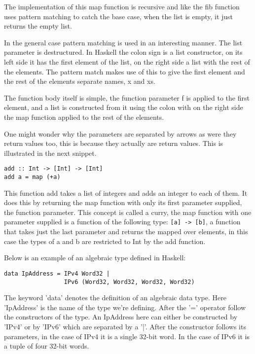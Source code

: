 The implementation of this map function is recursive and like the fib function uses pattern matching to catch the base case, when the list is empty, it just returns the empty list.

In the general case pattern matching is used in an interesting manner. The list parameter is destructured. In Haskell the colon sign is a list constructor, on its left side it has the first element of the list, on the right side a list with the rest of the elements. The pattern match makes use of this to give the first element and the rest of the elements separate names, x and xs.

The function body itself is simple, the function parameter f is applied to the first element, and a list is constructed from it using the colon with on the right side the map function applied to the rest of the elements.

One might wonder why the parameters are separated by arrows as were they return values too, this is because they actually are return values. This is illustrated in the next snippet. 

\begin{lstlisting}[caption={The map function}]
add :: Int -> [Int] -> [Int]
add a = map (+a)
\end{lstlisting}

This function add takes a list of integers and adds an integer to each of them. It does this by returning the map function with only its first parameter supplied, the function parameter. This concept is called a curry, the map function with one parameter supplied is a function of the following type: \lstinline{[a] -> [b]}, a function that takes just the last parameter and returns the mapped over elements, in this case the types of a and b are restricted to Int by the add function.


Below is an example of an algebraic type defined in Haskell:

\begin{lstlisting}[caption={IP address type}]
data IpAddress = IPv4 Word32 |
                 IPv6 (Word32, Word32, Word32, Word32)
\end{lstlisting}

The keyword 'data' denotes the definition of an algebraic data type. Here 'IpAddress' is the name of the type we're defining.
After the '=' operator follow the constructors of the type. An IpAddress here can either be constructed by 'IPv4' or by 'IPv6' which are separated by a '|'.
After the constructor follows its parameters, in the case of IPv4 it is a single 32-bit word. In the case of IPv6 it is a tuple of four 32-bit words.

